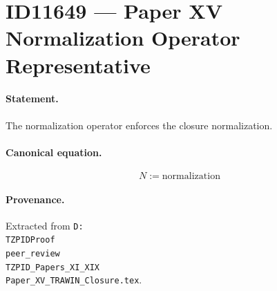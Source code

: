 \section*{ID11649 --- Paper XV Normalization Operator Representative}

\paragraph{Statement.}
The normalization operator enforces the closure normalization.

\paragraph{Canonical equation.}
\[
N:=\mathrm{normalization}
\]

\paragraph{Provenance.}
Extracted from \texttt{D:\\TZPIDProof\\peer\_review\\TZPID\_Papers\_XI\_XIX\\Paper\_XV\_TRAWIN\_Closure.tex}.
